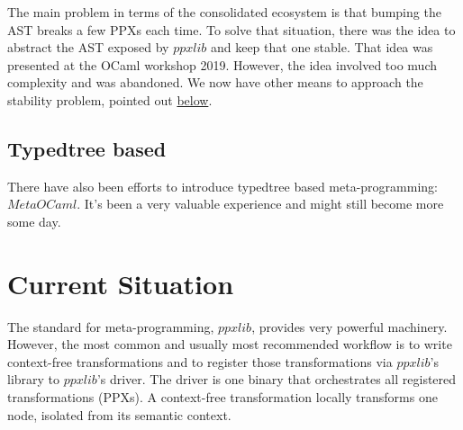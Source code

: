 \documentclass[10pt, a4paper, twocolumn]{article}
\begin{document}
The main problem in terms of the consolidated ecosystem is that bumping the AST
breaks a few PPXs each time. To solve that situation, there was the idea to
abstract the AST exposed by $ppxlib$ and keep that one stable. That idea was
presented at the OCaml workshop 2019\cite{workshop2019}. However, the idea
involved too much complexity and was abandoned. We now have other means to
approach the stability problem, pointed out \hyperref[stability]{below}.


\subsection{Typedtree based}

There have also been efforts to introduce typedtree based meta-programming:
$MetaOCaml$\cite{metaocaml}. It's been a very valuable experience and might
still become more some day.

\section{Current Situation}

The standard for meta-programming, $ppxlib$, provides very powerful machinery.
However, the most common and usually most recommended workflow is to write
context-free transformations and to register those transformations via
$ppxlib$'s library to $ppxlib$'s driver. The driver is one binary that
orchestrates all registered transformations (PPXs). A context-free
transformation locally transforms one node, isolated from its semantic context.

\vspace{20pt}
\end{document}
